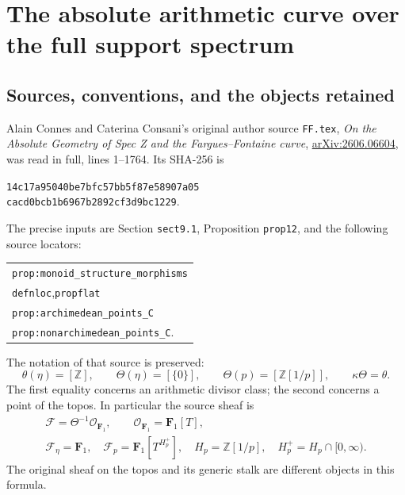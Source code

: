 \section{The absolute arithmetic curve over the full support spectrum}
\subsection{Sources, conventions, and the objects retained}
Alain Connes and Caterina Consani's original author source
\texttt{FF.tex}, \emph{On the Absolute Geometry of Spec Z and the
Fargues--Fontaine curve},
\href{https://arxiv.org/abs/2606.06604}{arXiv:2606.06604}, was read in
full, lines 1--1764. Its SHA-256 is
\begin{center}\small\texttt{14c17a95040be7bfc57bb5f87e58907a05}\\
\texttt{cacd0bcb1b6967b2892cf3d9bc1229}.\end{center}
The precise inputs are Section \texttt{sect9.1}, Proposition
\texttt{prop12}, and the following source locators:
\begin{center}\small
\begin{tabular}{l}
\texttt{prop:monoid\_structure\_morphisms}\\
\texttt{defnloc},\quad \texttt{propflat}\\
\texttt{prop:archimedean\_points\_C}\\
\texttt{prop:nonarchimedean\_points\_C}.
\end{tabular}
\end{center}
The notation of that source is
preserved:
\begin{equation}\tag{ACF1}
 \theta(\eta)=[\mathbb Z],\qquad
 \Theta(\eta)=[\{0\}],\qquad
 \Theta(p)=[\mathbb Z[1/p]],\qquad \kappa\Theta=\theta.
\end{equation}
The first equality concerns an arithmetic divisor class; the second
concerns a point of the topos. In particular the source sheaf is
\begin{equation}\tag{ACF2}
 \begin{gathered}
 \mathcal F=\Theta^{-1}\mathcal O_{\mathbf F_1},\qquad
 \mathcal O_{\mathbf F_1}=\mathbf F_1[T],\\
 \mathcal F_\eta=\mathbf F_1,\quad
 \mathcal F_p=\mathbf F_1[T^{H_p^+}],\quad
 H_p=\mathbb Z[1/p],\quad H_p^+=H_p\cap[0,\infty).
 \end{gathered}
\end{equation}
The original sheaf on the topos and its generic stalk are different
objects in this formula.

